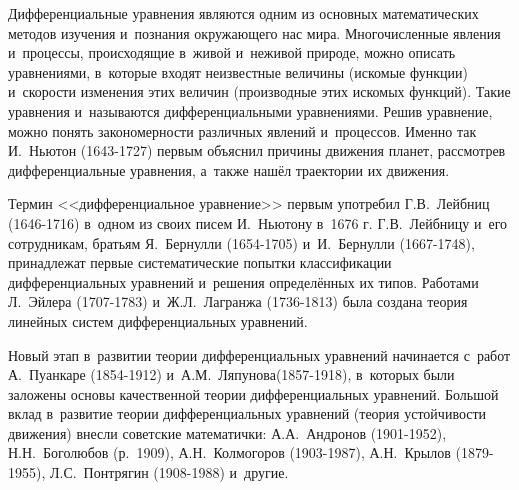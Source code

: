 
Дифференциальные уравнения являются одним из основных математических методов изучения
и~познания окружающего нас мира. Многочисленные явления и~процессы, происходящие
в~живой и~неживой природе, можно описать уравнениями, в~которые входят неизвестные
величины (искомые функции) и~скорости изменения этих величин (производные этих
искомых функций). Такие уравнения и~называются дифференциальными уравнениями.
Решив уравнение, можно понять закономерности различных явлений и~процессов.
Именно так И.~Ньютон (1643-1727) первым объяснил причины движения планет,
рассмотрев дифференциальные уравнения, а~также нашёл траектории их движения.

Термин <<дифференциальное уравнение>> первым употребил Г.В.~Лейбниц (1646-1716)
в~одном из своих писем И.~Ньютону в~1676 г. Г.В.~Лейбницу и~его сотрудникам,
братьям Я.~Бернулли (1654-1705) и~И.~Бернулли (1667-1748), принадлежат первые
систематические попытки классификации дифференциальных уравнений и~решения
определённых их типов. Работами Л.~Эйлера (1707-1783) и~Ж.Л.~Лагранжа (1736-1813)
была создана теория линейных систем дифференциальных уравнений.

Новый этап в~развитии теории дифференциальных уравнений начинается с~работ
А.~Пуанкаре (1854-1912) и~А.М.~Ляпунова(1857-1918), в~которых были заложены
основы качественной теории дифференциальных уравнений. Большой вклад в~развитие
теории дифференциальных уравнений (теория устойчивости движения) внесли
советские математички: А.А.~Андронов (1901-1952), Н.Н.~Боголюбов (р.~1909),
А.Н.~Колмогоров (1903-1987), А.Н.~Крылов (1879-1955), Л.С.~Понтрягин (1908-1988)
и~другие.
